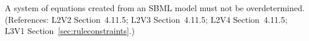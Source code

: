 A system of equations created from an SBML model must not be
overdetermined.  (References: L2V2 Section~4.11.5; L2V3
Section~4.11.5; L2V4 Section~4.11.5; L3V1 Section~\ref{sec:ruleconstraints}.)
